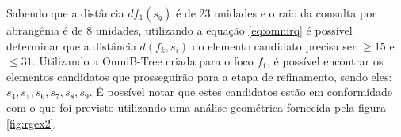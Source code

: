 Sabendo que a distância $df_1(s_q)$ é de 23 unidades e o raio da consulta por abrangênia é de 8 unidades, utilizando a equação \ref{eq:omnirq} é possível determinar que a distância $d(f_k, s_i)$ do elemento candidato precisa ser $\geq 15$ e $\leq 31$.
Utilizando a OmniB-Tree criada para o foco $f_1$, é possível encontrar os elementos candidatos que prosseguirão para a etapa de refinamento, sendo eles: $s_4, s_5, s_6, s_7, s_8, s_9$. É possível notar que estes candidatos estão em conformidade com o que
foi previsto utilizando uma análise geométrica fornecida pela figura \ref{fig:rgex2}.
